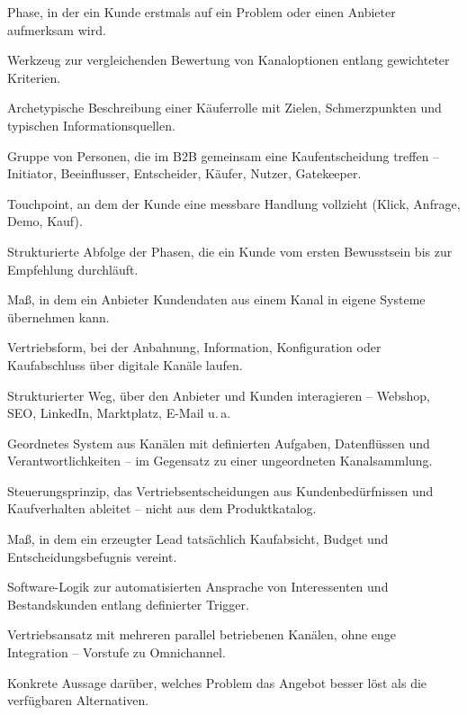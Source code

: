 \documentclass[11pt,a4paper,oneside]{article}
\begin{document}
\begin{description}[style=nextline,leftmargin=0pt,labelindent=0pt,itemsep=4pt]
  \item[Awareness] Phase, in der ein Kunde erstmals auf ein Problem oder einen Anbieter aufmerksam wird.
  \item[Bewertungsmatrix] Werkzeug zur vergleichenden Bewertung von Kanaloptionen entlang gewichteter Kriterien.
  \item[Buyer Persona] Archetypische Beschreibung einer Käuferrolle mit Zielen, Schmerzpunkten und typischen Informationsquellen.
  \item[Buying Center] Gruppe von Personen, die im B2B gemeinsam eine Kaufentscheidung treffen -- Initiator, Beeinflusser, Entscheider, Käufer, Nutzer, Gatekeeper.
  \item[Conversion-Punkt] Touchpoint, an dem der Kunde eine messbare Handlung vollzieht (Klick, Anfrage, Demo, Kauf).
  \item[Customer Journey] Strukturierte Abfolge der Phasen, die ein Kunde vom ersten Bewusstsein bis zur Empfehlung durchläuft.
  \item[Datenzugang] Maß, in dem ein Anbieter Kundendaten aus einem Kanal in eigene Systeme übernehmen kann.
  \item[Digitaler Vertrieb] Vertriebsform, bei der Anbahnung, Information, Konfiguration oder Kaufabschluss über digitale Kanäle laufen.
  \item[Kanal] Strukturierter Weg, über den Anbieter und Kunden interagieren -- Webshop, SEO, LinkedIn, Marktplatz, E-Mail u.\,a.
  \item[Kanalarchitektur] Geordnetes System aus Kanälen mit definierten Aufgaben, Datenflüssen und Verantwortlichkeiten -- im Gegensatz zu einer ungeordneten Kanalsammlung.
  \item[Kundenzentrierung] Steuerungsprinzip, das Vertriebsentscheidungen aus Kundenbedürfnissen und Kaufverhalten ableitet -- nicht aus dem Produktkatalog.
  \item[Leadqualität] Maß, in dem ein erzeugter Lead tatsächlich Kaufabsicht, Budget und Entscheidungsbefugnis vereint.
  \item[Marketing Automation] Software-Logik zur automatisierten Ansprache von Interessenten und Bestandskunden entlang definierter Trigger.
  \item[Multichannel] Vertriebsansatz mit mehreren parallel betriebenen Kanälen, ohne enge Integration -- Vorstufe zu Omnichannel.
  \item[Nutzenversprechen] Konkrete Aussage darüber, welches Problem das Angebot besser löst als die verfügbaren Alternativen.

\end{description}
\end{document}
